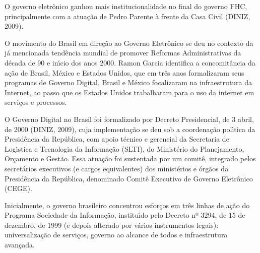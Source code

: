 \documentclass[
12pt,		%
openright,	%
twoside,  %
a4paper,			%
chapter=TITLE,		%
english,			%
french,				%
spanish,			%
brazil				%
]{USPSC-classe/USPSC}
\begin{document}
O governo eletr\^onico ganhou mais institucionalidade no final do governo FHC, principalmente com a atua\c{c}\~ao de Pedro Parente \`a frente da Casa Civil (DINIZ, 2009).

















O movimento do Brasil em dire\c{c}\~ao ao Governo Eletr\^onico se deu no contexto da j\'a mencionada tend\^encia mundial de promover Reformas Administrativas da d\'ecada de 90 e in\'{\i}cio dos anos 2000. Ramon Garcia identifica a concomit\^ancia da a\c{c}\~ao de Brasil, M\'exico e Estados Unidos, que em tr\^es anos formalizaram seus programas de Governo Digital. Brasil e M\'exico focalizaram na infraestrutura da Internet, ao passo que os Estados Unidos trabalharam para o uso da internet em servi\c{c}os e processos.

















O Governo Digital no Brasil foi formalizado por Decreto Presidencial, de 3 abril, de 2000  (DINIZ, 2009), cuja implementa\c{c}\~ao se deu sob a coordena\c{c}\~ao pol\'{\i}tica da Presid\^encia da Rep\'ublica, com apoio t\'ecnico e gerencial da Secretaria de Log\'{\i}stica e Tecnologia da Informa\c{c}\~ao (SLTI), do Minist\'erio do Planejamento, Or\c{c}amento e Gest\~ao. Essa atua\c{c}\~ao foi sustentada por um comit\^e, integrado pelos secret\'arios executivos (e cargos equivalentes) dos minist\'erios e \'org\~aos da Presid\^encia da Rep\'ublica, denominado Comit\^e Executivo de Governo Eletr\^onico (CEGE).

















Inicialmente, o governo brasileiro concentrou esfor\c{c}os em tr\^es linhas de a\c{c}\~ao do Programa Sociedade da Informa\c{c}\~ao, institu\'{\i}do pelo Decreto nº 3294, de 15 de dezembro, de 1999 (e depois alterado por v\'arios instrumentos legais): universaliza\c{c}\~ao de servi\c{c}os, governo ao alcance de todos e infraestrutura avan\c{c}ada.
\end{document}
